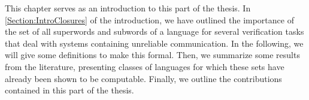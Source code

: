 \documentclass[../../diss.tex]{subfiles}
\begin{document}
This chapter serves as an introduction to this part of the thesis.
In \cref{Section:IntroClosures} of the introduction, we have outlined the importance of the set of all superwords and subwords of a language for several verification tasks that deal with systems containing unreliable communication.
In the following, we will give some definitions to make this formal.
Then, we summarize some results from the literature, presenting classes of languages for which these sets have already been shown to be computable.
Finally, we outline the contributions contained in this part of the thesis.
\end{document}
